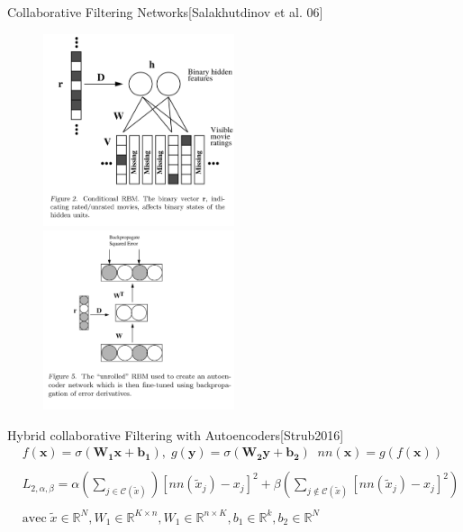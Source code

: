\documentclass{beamer} %
\begin{document}
\begin{frame}{Collaborative Filtering Networks}{[Salakhutdinov et al. 06]}
	
    \begin{figure}
    
    	\includegraphics[width=0.5\textwidth]{images/conditional_rbm.png}
    	\includegraphics[width=0.5\textwidth]{images/unrolled_rbm.png}
    \end{figure}

\end{frame}

\begin{frame}{Hybrid collaborative Filtering with Autoencoders}{[Strub2016]}
\begin{equation*}
\begin{split}
  & f(\bm{x}) = \sigma(\bm{W_1 x+b_1}),\; g(\bm{y}) = \sigma(\bm{W_2 y+b_2} ) \; \;nn(\bm{x}) = g(f(\bm{x}))\\
  & \\
& L_{2, \alpha, \beta} = \alpha ( \sum_{j \in \mathcal{C}(\tilde{x})}) [ nn(\tilde{x}_j) - x_j ]^2 
+ \beta ( \sum_{j \notin \mathcal{C}(\tilde{x})} [nn(\tilde{x}_j) - x_j ]^2) \\
& \\
& \text{avec} \; \tilde{x} \in \mathbb{R}^N, W_1 \in \mathbb{R}^{K\times n}, W_1 \in \mathbb{R}^{n\times K}, b_1 \in \mathbb{R}^k, b_2 \in \mathbb{R}^N
\end{split}
\end{equation*}
\end{frame}
\end{document}
